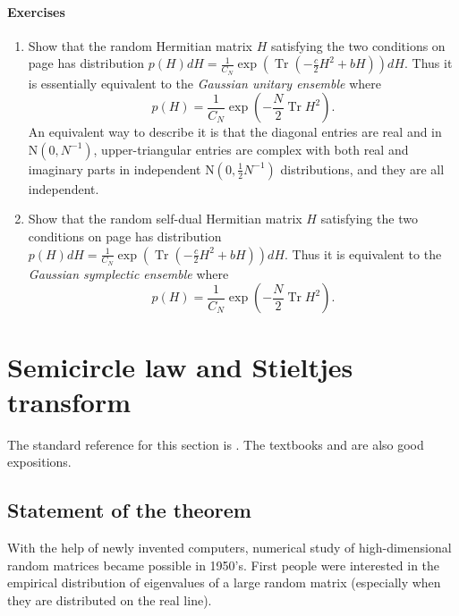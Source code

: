 \documentclass[11pt, a4paper]{article}
\numberwithin{equation}{section}
\newcommand{\Normal}{\mathrm{N}}
\DeclareMathOperator{\Tr}{Tr}
\theoremstyle{definition}
\theoremstyle{remark}
\begin{document}
\paragraph{Exercises}

\begin{enumerate}
\item \label{enu:Ex_Sec_1:1}
  Show that the random Hermitian matrix $H$ satisfying the two conditions on page \pageref{enu:condition_for_GUE:1} has distribution $p(H) dH = \frac{1}{C_N} \exp(\Tr(-\frac{c}{2} H^2 + bH)) dH$. Thus it is essentially equivalent to the \emph{Gaussian unitary ensemble} where
  \begin{equation}
    p(H) = \frac{1}{C_N} \exp(-\frac{N}{2} \Tr H^2).
  \end{equation}
  An equivalent way to describe it is that the diagonal entries are real and in $\Normal(0, N^{-1})$, upper-triangular entries are complex with both real and imaginary parts in independent $\Normal(0, \frac{1}{2}N^{-1})$ distributions, and they are all independent.
\item
  Show that the random self-dual Hermitian matrix $H$ satisfying the two conditions on page \pageref{enu:condition_for_GSE:1} has distribution $p(H) dH = \frac{1}{C_N} \exp(\Tr(-\frac{c}{2} H^2 + bH)) dH$. Thus it is equivalent to the \emph{Gaussian symplectic ensemble} where
  \begin{equation}
    p(H) = \frac{1}{C_N} \exp(-\frac{N}{2} \Tr H^2).
  \end{equation}
\end{enumerate}

\section{Semicircle law and Stieltjes transform} \label{sec:semicircle_law}

The standard reference for this section is \cite[Chapter 2, especially Section 2.3]{Bai-Silverstein10}. The textbooks \cite[Chapter 2, especially Section 2.4]{Anderson-Guionnet-Zeitouni10} and \cite[Section 2.4]{Tao12} are also good expositions.

\subsection{Statement of the theorem}

With the help of newly invented computers, numerical study of high-dimensional random matrices became possible in 1950's. First people were interested in the empirical distribution of eigenvalues of a large random matrix (especially when they are distributed on the real line).
\end{document}
